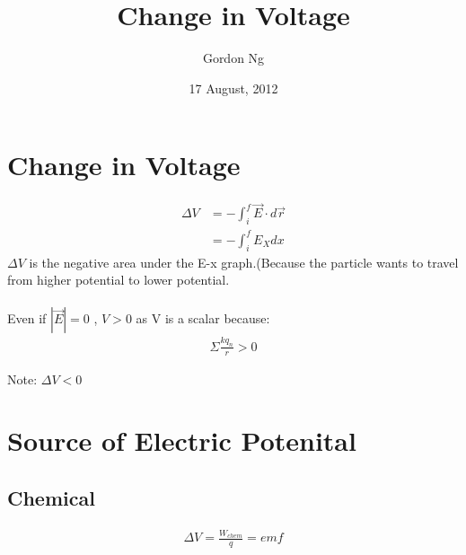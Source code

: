 \documentclass[12pt]{article}
\begin{document}
\title{Change in Voltage}
\date{17 August, 2012}
\author{Gordon Ng}
\maketitle
\pagebreak
\tableofcontents
\pagebreak
\section{Change in Voltage}
\begin{align}
\Delta V &= - \int_i^f \vec{E}\cdot{d\vec{r}} \\
&=- \int_i^f E_X dx
\end{align}
$\Delta V$ is the negative area under the E-x graph.(Because the particle wants to travel from higher potential to lower potential. \\ \\

Even if $|\vec{E}| = 0$ , $V>0$ as V is a scalar because:
\begin{align*}
\Sigma \frac{kq_n}{r}>0
\end{align*}

Note: $\Delta V < 0$

\section{Source of Electric Potenital}
\subsection{Chemical}
\begin{align}
\Delta V = \frac{W_{chem}}{q} = emf
\end{align}
\end{document}

